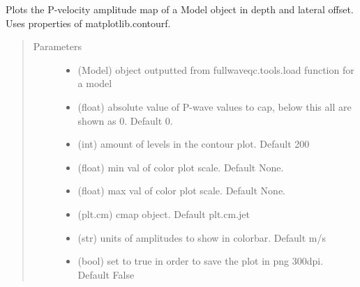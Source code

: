 \documentclass[letterpaper,10pt,english]{sphinxmanual}
\begin{document}

\begin{fulllineitems}
\label{\detokenize{index:fullwaveqc.visual.vpmodel}}
Plots the P-velocity amplitude map of a Model object in depth and lateral offset.
Uses properties of matplotlib.contourf.
\begin{quote}\begin{description}
\item[{Parameters}] \leavevmode\begin{itemize}
\item {} 
 \textendash{} (Model)      object outputted from fullwaveqc.tools.load function for a model

\item {} 
 \textendash{} (float)      absolute value of P-wave values to cap, below this all are shown as 0. Default 0.

\item {} 
 \textendash{} (int)        amount of levels in the contour plot. Default 200

\item {} 
 \textendash{} (float)      min val of color plot scale. Default None.

\item {} 
 \textendash{} (float)      max val of color plot scale. Default None.

\item {} 
 \textendash{} (plt.cm)     cmap object. Default plt.cm.jet

\item {} 
 \textendash{} (str)        units of amplitudes to show in colorbar. Default m/s

\item {} 
 \textendash{} (bool)       set to true in order to save the plot in png 300dpi. Default False


\end{itemize}
\end{description}
\end{quote}
\end{fulllineitems}
\end{document}
